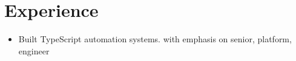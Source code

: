 \documentclass{article}
\begin{document}
\section{Experience}
\begin{itemize}
\item Built TypeScript automation systems. with emphasis on senior, platform, engineer
\end{itemize}
\end{document}

